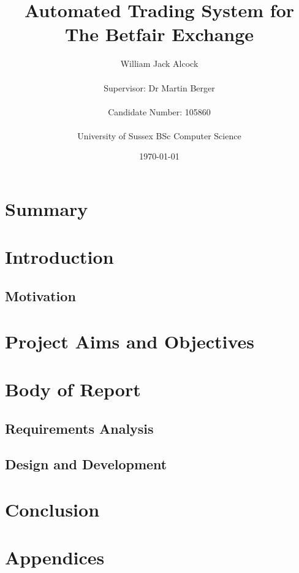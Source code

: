 \documentclass[11pt]{report}
\begin{document}
\title{Automated Trading System for The Betfair Exchange}
\author{William Jack Alcock\\\\Supervisor: Dr Martin Berger\\\\Candidate Number: 105860\\\\University of Sussex BSc Computer Science}
\date{\today}

\maketitle





\chapter{Summary}

\tableofcontents

\chapter{Introduction}
	\section{Motivation}
	


\chapter{Project Aims and Objectives}

\chapter{Body of Report}
	\section{Requirements Analysis}
	\section{Design and Development}
\chapter{Conclusion}

\chapter{Appendices}

\printbibliography[heading=bibintoc]
\end{document}
